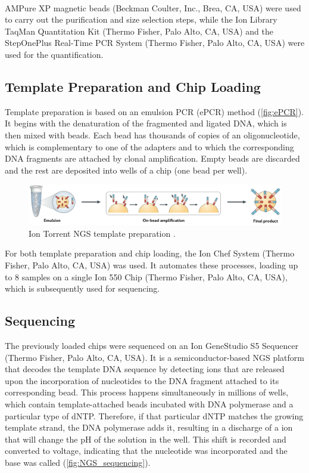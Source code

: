 AMPure XP\textsuperscript\textregistered{} magnetic beads (Beckman Coulter, Inc., Brea, CA, USA) were used to carry out the purification and size selection steps, while the Ion Library TaqMan\texttrademark{} Quantitation Kit (Thermo Fisher, Palo Alto, CA, USA) and the StepOnePlus\texttrademark{} Real-Time PCR System (Thermo Fisher, Palo Alto, CA, USA) were used for the quantification.

\subsection{Template Preparation and Chip Loading}

Template preparation is based on an emulsion PCR (ePCR) method (\autoref{fig:ePCR}). It begins with the denaturation of the fragmented and ligated DNA, which is then mixed with beads. Each bead has thousands of copies of an oligonucleotide, which is complementary to one of the adapters and to which the corresponding DNA fragments are attached by clonal amplification. Empty beads are discarded and the rest are deposited into wells of a chip (one bead per well).

\begin{figure}[ht]
    \centering
    \includegraphics[width=\textwidth]{Images/chapter_3/ePCR.png}
    \caption{Ion Torrent NGS template preparation \cite{NGS}.}
    \label{fig:ePCR}
\end{figure}

For both template preparation and chip loading, the Ion Chef\texttrademark{} System (Thermo Fisher, Palo Alto, CA, USA) was used. It automates these processes, loading up to 8 samples on a single Ion 550\texttrademark{} Chip (Thermo Fisher, Palo Alto, CA, USA), which is subsequently used for sequencing.

\subsection{Sequencing}

The previously loaded chips were sequenced on an Ion GeneStudio\texttrademark{} S5 Sequencer (Thermo Fisher, Palo Alto, CA, USA). It is a semiconductor-based NGS platform that decodes the template DNA sequence by detecting  ions that are released upon the incorporation of nucleotides to the DNA fragment attached to its corresponding bead. This process happens simultaneously in millions of wells, which contain template-attached beads incubated with DNA polymerase and a particular type of dNTP. Therefore, if that particular dNTP matches the growing template strand, the DNA polymerase adds it, resulting in a discharge of a  ion that will change the pH of the solution in the well. This shift is recorded and converted to voltage, indicating that the nucleotide was incorporated and the base was called (\autoref{fig:NGS_sequencing}).
 
